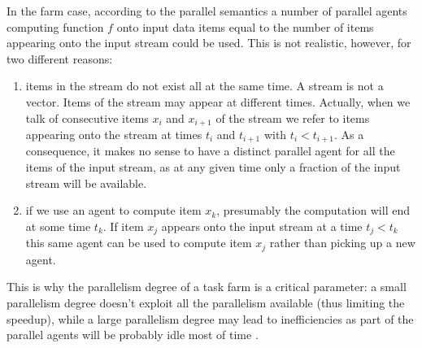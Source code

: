 In the farm case, according to the parallel semantics a number of parallel agents computing function \(f\) onto input data items equal to the number of items appearing onto the input stream could be used. This is not realistic, however, for two different reasons:

\begin{enumerate}
	\item items in the stream do not exist all at the same time. A stream is not a vector.
	Items of the stream may appear at different times. Actually, when we talk of consecutive items \(x_{i}\) and \(x_{i+1}\) of the stream we refer to items appearing onto the stream at times \(t_{i}\) and \(t_{i+1}\) with \(t_{i} < t_{i+1}\). As a consequence, it makes no sense to have a distinct parallel agent for all the items of the input stream, as at any given time only a fraction of the input stream will be available.
	
	\item if we use an agent to compute item \(x_{k}\), presumably the computation will end at some
	time \(t_{k}\). If item \(x_{j}\) appears onto the input stream at a time \(t_{j} < t_{k}\) this same agent
	can be used to compute item \(x_{j}\) rather than picking up a new agent. \\
\end{enumerate}
This is why the parallelism degree of a task farm is a critical parameter: a small parallelism degree doesn't exploit all the parallelism available (thus limiting the speedup), while a large parallelism degree may lead to inefficiencies as part of the parallel agents will be probably idle most of time \cite{spm}.\\

